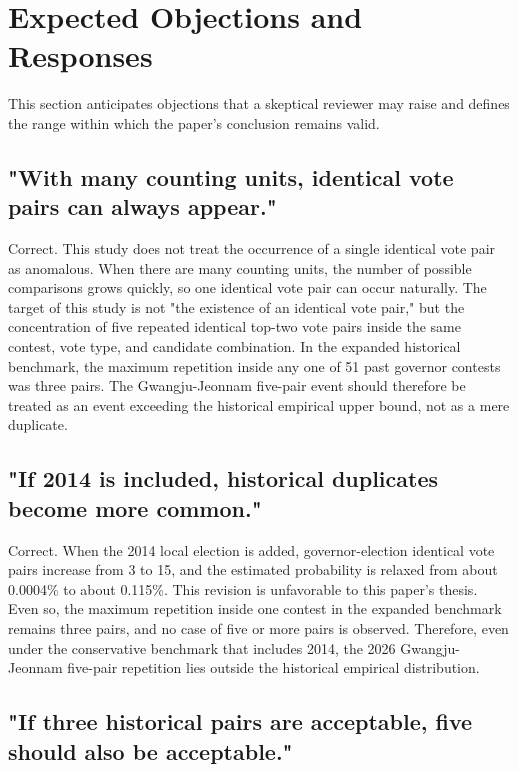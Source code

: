 \documentclass[preprint]{IEIE}
\begin{document}
\section{Expected Objections and Responses}

This section anticipates objections that a skeptical reviewer may raise and defines the range within which the paper's conclusion remains valid.

\subsection{"With many counting units, identical vote pairs can always appear."}

Correct. This study does not treat the occurrence of a single identical vote pair as anomalous. When there are many counting units, the number of possible comparisons grows quickly, so one identical vote pair can occur naturally. The target of this study is not "the existence of an identical vote pair," but the concentration of five repeated identical top-two vote pairs inside the same contest, vote type, and candidate combination. In the expanded historical benchmark, the maximum repetition inside any one of 51 past governor contests was three pairs. The Gwangju-Jeonnam five-pair event should therefore be treated as an event exceeding the historical empirical upper bound, not as a mere duplicate.

\subsection{"If 2014 is included, historical duplicates become more common."}

Correct. When the 2014 local election is added, governor-election identical vote pairs increase from 3 to 15, and the estimated probability is relaxed from about 0.0004\% to about 0.115\%. This revision is unfavorable to this paper's thesis. Even so, the maximum repetition inside one contest in the expanded benchmark remains three pairs, and no case of five or more pairs is observed. Therefore, even under the conservative benchmark that includes 2014, the 2026 Gwangju-Jeonnam five-pair repetition lies outside the historical empirical distribution.

\subsection{"If three historical pairs are acceptable, five should also be acceptable."}
\end{document}
